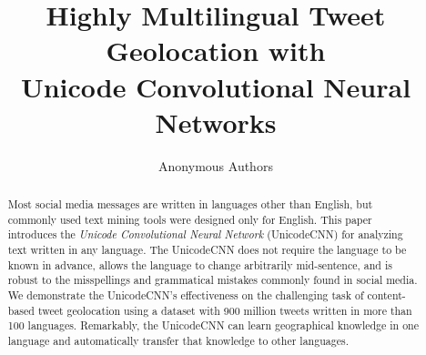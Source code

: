 \documentclass[sigconf,10pt]{acmart}
\title{Highly Multilingual Tweet Geolocation with \\ Unicode Convolutional Neural Networks}
\author{Anonymous Authors}
\affiliation{}
\newcommand{\defn}[1]{\textit{#1}}
\newcommand{\fixme}[1]{\textcolor{red}{\textbf{FIXME:} {#1}}}
\begin{document}
\begin{abstract}
    Most social media messages are written in languages other than English,
    but commonly used text mining tools were designed only for English.
    This paper introduces the \defn{Unicode Convolutional Neural Network} (UnicodeCNN) for analyzing text written in any language.
    The UnicodeCNN does not require the language to be known in advance,
    allows the language to change arbitrarily mid-sentence,
    and is robust to the misspellings and grammatical mistakes commonly found in social media.
    We demonstrate the UnicodeCNN's effectiveness on the challenging task of content-based tweet geolocation using a dataset with 900 million tweets written in more than 100 languages.
    Remarkably, the UnicodeCNN can learn geographical knowledge in one language and automatically transfer that knowledge to other languages.


\end{abstract}
\end{document}
